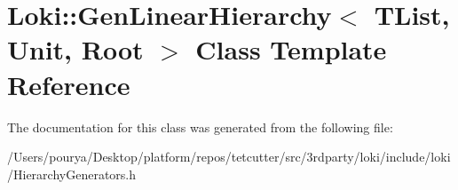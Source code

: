 \hypertarget{classLoki_1_1GenLinearHierarchy}{}\section{Loki\+:\+:Gen\+Linear\+Hierarchy$<$ T\+List, Unit, Root $>$ Class Template Reference}
\label{classLoki_1_1GenLinearHierarchy}


The documentation for this class was generated from the following file\+:\begin{DoxyCompactItemize}
\item 
/\+Users/pourya/\+Desktop/platform/repos/tetcutter/src/3rdparty/loki/include/loki/Hierarchy\+Generators.\+h\end{DoxyCompactItemize}
